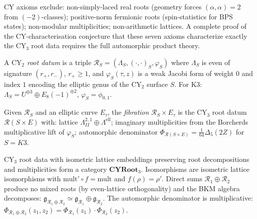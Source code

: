 \begin{remark}
\label{rem:thy-grd-cy-exclusions}
CY axioms exclude: non-simply-laced real roots (geometry forces $(\alpha,\alpha)=2$
from $(-2)$-classes); positive-norm fermionic roots (spin-statistics for BPS states);
non-modular multiplicities; non-arithmetic lattices. A complete proof of
the CY-characterisation conjecture that these seven axioms characterize
exactly the CY$_3$ root data requires the full automorphic product theory.
\end{remark}

\begin{definition}
\label{def:thy-grd-fibration}
A \emph{$\mathrm{CY}_2$ root datum} is a triple $\mathcal{R}_S=(\Lambda_S,(\cdot,\cdot)_S,\varphi_S)$
where $\Lambda_S$ is even of signature $(r_+,r_-)$, $r_+\geq 1$, and $\varphi_S(\tau,z)$
is a weak Jacobi form of weight $0$ and index $1$ encoding the elliptic genus of
the CY$_2$ surface $S$. For K3: $\Lambda_S=U^{\oplus 3}\oplus E_8(-1)^{\oplus 2}$,
$\varphi_S=\phi_{0,1}$.

Given $\mathcal{R}_S$ and an elliptic curve $E_\tau$, the \emph{fibration}
$\mathcal{R}_S\times E_\tau$ is the $\mathrm{CY}_3$ root datum
$\mathcal{R}(S\times E)$ with:
lattice $\Lambda^{2,1}_{II}\oplus\Lambda^{\mathrm{ell}}$;
imaginary multiplicities from the Borcherds multiplicative lift of $\varphi_S$;
automorphic denominator $\Phi_{\mathcal{R}(S\times E)}=\frac{1}{64}\Delta_5(2Z)$
for $S=K3$.
\end{definition}

\begin{proposition}
\label{prop:thy-grd-category}
$\mathrm{CY}_3$ root data with isometric lattice embeddings preserving root
decompositions and multiplicities form a category $\mathbf{CYRoot}_3$.
Isomorphisms are isometric lattice isomorphisms with $\mathrm{mult}'\circ f=\mathrm{mult}$
and $f(\rho)=\rho'$. Direct sums $\mathcal{R}_1\oplus\mathcal{R}_2$ produce
no mixed roots (by even-lattice orthogonality) and the BKM algebra decomposes:
$\mathfrak{g}_{\mathcal{R}_1\oplus\mathcal{R}_2}\simeq\mathfrak{g}_{\mathcal{R}_1}
\oplus\mathfrak{g}_{\mathcal{R}_2}$. The automorphic denominator is multiplicative:
$\Phi_{\mathcal{R}_1\oplus\mathcal{R}_2}(z_1,z_2)=\Phi_{\mathcal{R}_1}(z_1)\cdot\Phi_{\mathcal{R}_2}(z_2)$.
\end{proposition}

